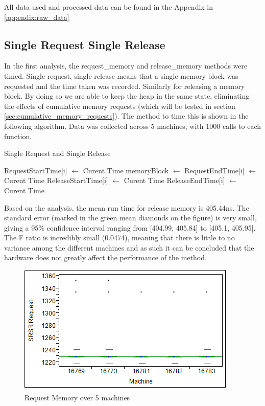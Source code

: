 \documentclass[12pt]{report}
\begin{document}
\par All data used and processed data can be found in the Appendix in \ref{appendix:raw_data}

\subsection{Single Request Single Release}
\label{sec:single_request_single_release}
In the first analysis, the request\_memory and release\_memory methods were timed. Single request, single release means that a single memory block was requested and the time taken was recorded. Similarly for releasing a memory block. By doing so we are able to keep the heap in the same state, eliminating the effects of cumulative memory requests (which will be tested in section \ref{sec:cumulative_memory_requests}). The method to time this is shown in the following algorithm. Data was collected across 5 machines, with 1000 calls to each function.

\begin{algorithm}
  \caption{Single Request and Single Release}
  \begin{algorithmic}[1]
        \State RequestStartTime[i] $\gets$ Curent Time
        \State memoryBlock $\gets$  
        \State RequestEndTime[i] $\gets$ Curent Time
        \State ReleaseStartTime[i] $\gets$ Curent Time
        \State {}
        \State ReleaseEndTime[i] $\gets$ Curent Time
      \EndFor
    \EndFunction
  \end{algorithmic}
\end{algorithm}

Based on the analysis, the mean run time for release memory is 405.44ns. The standard error (marked in the green mean diamonds on the figure) is very small, giving a 95\% confidence interval ranging from [404.99, 405.84] to [405.1, 405.95]. The F ratio is incredibly small (0.0474), meaning that there is little to no variance among the different machines and as such it can be concluded that the hardware does not greatly affect the performance of the method.

\begin{figure}[h!]
  \centering
    \includegraphics{SRSRRequestMemory.png}
  \caption{Request Memory over 5 machines}
\end{figure}
\end{document}
